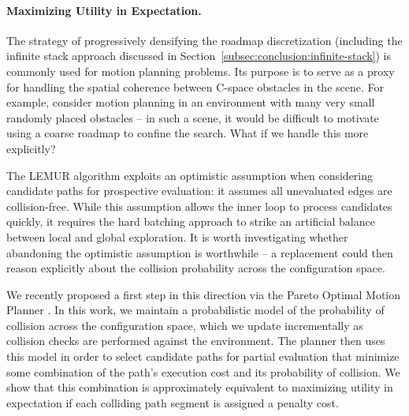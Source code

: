 
\paragraph{Maximizing Utility in Expectation.}
The strategy of progressively densifying the roadmap discretization
(including the infinite stack approach discussed
in Section~\ref{subsec:conclusion:infinite-stack})
is commonly used for motion planning problems.
Its purpose is to serve as a proxy for handling the spatial coherence
between C-space obstacles in the scene.
For example,
consider motion planning in an environment with many very small
randomly placed obstacles --
in such a scene, it would be difficult to motivate using a coarse
roadmap to confine the search.
What if we handle this more explicitly?

The LEMUR algorithm exploits an optimistic assumption when considering
candidate paths for prospective evaluation:
it assumes all unevaluated edges are collision-free.
While this assumption allows the inner loop to process candidates
quickly,
it requires the hard batching approach to strike an artificial
balance between local and global exploration.
It is worth investigating whether abandoning the optimistic
assumption is worthwhile --
a replacement could then reason explicitly about the collision
probability across the configuration space.

We recently proposed a first step in this direction
via the Pareto Optimal Motion Planner \citep{choudhury2016pomp}.
In this work,
we maintain a probabilistic model of the probability of collision
across the configuration space,
which we update incrementally as collision checks are performed
against the environment.
The planner then uses this model in order to select candidate paths
for partial evaluation that minimize some combination of the path's
execution cost and its probability of collision.
We show that this combination is approximately equivalent
to maximizing utility in expectation
if each colliding path segment is assigned a penalty cost.


